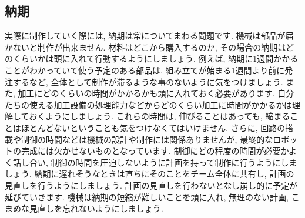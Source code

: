 \subsection{納期}
実際に制作していく際には, 納期は常についてまわる問題です. 機械は部品が届かないと制作が出来ません. 
材料はどこから購入するのか, その場合の納期はどのくらいかは頭に入れて行動するようにしましょう. 例えば, 納期に1週間かかることがわかっていて使う予定のある部品は, 組み立てが始まる1週間より前に発注するなど, 全体として制作が滞るような事のないように気をつけましょう. 
また, 加工にどのくらいの時間がかかるかも頭に入れておく必要があります. 自分たちの使える加工設備の処理能力などからどのくらい加工に時間がかかるかは理解しておくようにしましょう. これらの時間は, 伸びることはあっても, 縮まることはほとんどないということも気をつけなくてはいけません. さらに, 回路の搭載や制御の時間などは機械の設計や制作には関係ありませんが, 最終的なロボットの完成には欠かせないものとなっています. 制御にどの程度の時間が必要かよく話し合い, 制御の時間を圧迫しないように計画を持って制作に行うようにしましょう. 
納期に遅れそうなときは直ちにそのことをチーム全体に共有し, 計画の見直しを行うようにしましょう. 計画の見直しを行わないとなし崩し的に予定が延びていきます. 機械は納期の短縮が難しいことを頭に入れ, 無理のない計画, こまめな見直しを忘れないようにしましょう. 